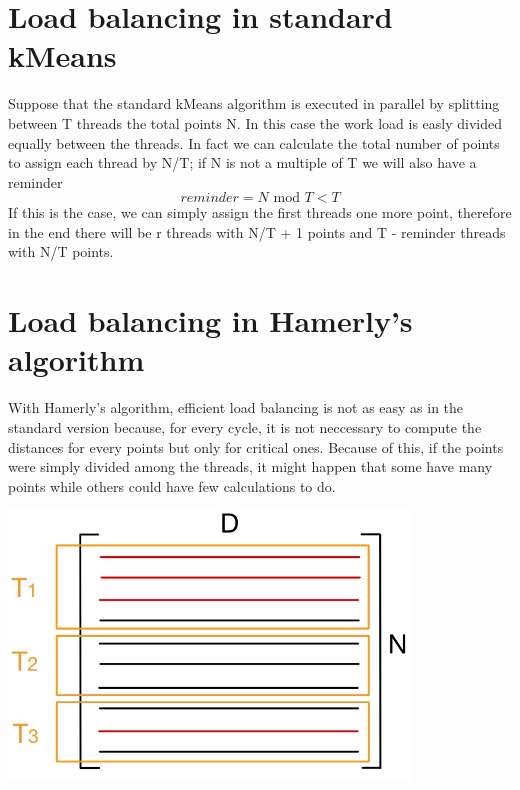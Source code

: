 \documentclass{report}
\begin{document}
  \begin{minipage}[b]{0.48\textwidth}
    \section*{Load balancing in standard kMeans}
    Suppose that the standard kMeans algorithm is executed in parallel by splitting between T threads the total points N. In this case the work load is easly divided equally between the threads. In fact we can calculate the total number of points to assign each thread by N/T; if N is not a multiple of T we will also have a reminder
    \begin{equation}
      reminder = N \text{ mod } T < T
    \end{equation}
    If this is the case, we can simply assign the first threads one more point, therefore in the end there will be r threads with N/T + 1 points and T - reminder threads with N/T points.

    \section*{Load balancing in Hamerly's algorithm}
    With Hamerly's algorithm, efficient load balancing is not as easy as in the standard version because, for every cycle, it is not neccessary to compute the distances for every points but only for critical ones. Because of this, if the points were simply divided among the threads, it might happen that some have many points while others could have few calculations to do.

    \begin{center}
      \includegraphics[width = 0.8\textwidth]{imgs/non_balances_hamerly.png}
      \label{fig:non_bal_ham}
    \end{center}


\end{minipage}
\end{document}
